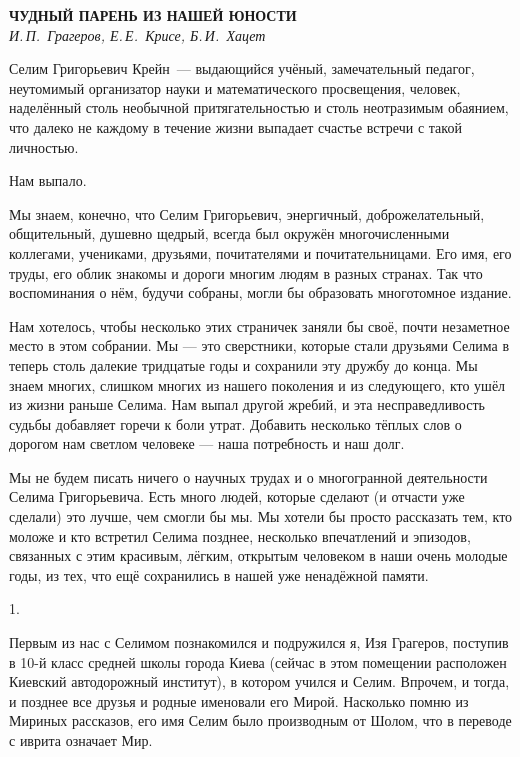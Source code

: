 \begin{center}{ \bf  ЧУДНЫЙ ПАРЕНЬ ИЗ НАШЕЙ ЮНОСТИ}\\
{\it И.\,П.~Грагеров, Е.\,Е.~Крисе, Б.\,И.~Хацет } \\
\end{center}

Селим Григорьевич Крейн~--- выдающийся учёный, замечательный педагог,
неутомимый организатор науки и математического просвещения, человек,
наделённый столь не\-о\-бы\-ч\-ной притягательностью и столь неотразимым обаянием,
что далеко не каждому в течение жизни выпадает счастье встречи с такой личностью.

Нам выпало.

Мы знаем, конечно, что Селим Григорьевич, энергичный, доброжелательный, общительный, душевно щедрый, всегда был окружён многочисленными коллегами, учениками, друзьями, почитателями и почитательницами. Его имя, его труды, его облик знакомы и дороги многим людям в разных странах. Так что воспоминания о нём, будучи собраны, могли бы образовать многотомное издание.

Нам хотелось, чтобы несколько этих страничек заняли бы своё, почти незаметное место в этом собрании. Мы --- это сверстники, которые стали друзьями Селима в теперь столь далекие тридцатые годы и сохранили эту дружбу до конца. Мы знаем многих, слишком многих из нашего поколения и из следующего, кто ушёл из жизни раньше Селима. Нам выпал другой жребий, и эта несправедливость судьбы добавляет горечи к боли утрат. Добавить несколько тёплых слов о дорогом нам светлом человеке --- наша потребность и наш долг.

Мы не будем писать ничего о научных трудах и о многогранной деятельности Селима Григорьевича. Есть много людей, которые сделают (и отчасти уже сделали) это лучше, чем смогли бы мы. Мы хотели бы просто рассказать тем, кто моложе и кто встретил Селима позднее, несколько впечатлений и эпизодов, связанных с этим красивым, лёгким, открытым человеком в наши очень молодые годы, из тех, что ещё сохранились в нашей уже ненадёжной памяти.

1.

Первым из нас с Селимом познакомился и подружился я, Изя Грагеров,
поступив в 10-й класс средней школы города Киева (сейчас в этом помещении расположен Киевский автодорожный институт),
в котором учился и Селим.
Впрочем, и тогда, и позднее все друзья и родные именовали его Мирой.
Насколько помню из Мириных рассказов, его имя Селим было производным от Шолом, что в переводе с иврита означает Мир.

